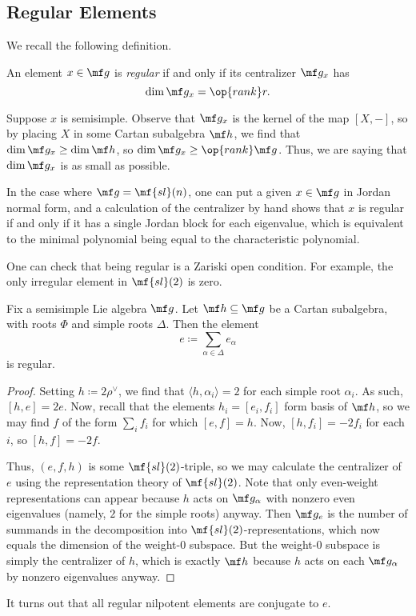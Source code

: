 \documentclass[../notes.tex]{subfiles}
\begin{document}
\subsection{Regular Elements}
We recall the following definition.
\begin{definition}[regular]
	An element $x\in\mf g$ is \textit{regular} if and only if its centralizer $\mf g_x$ has
	\[\dim\mf g_x=\op{rank}r.\]
\end{definition}
\begin{remark}
	Suppose $x$ is semisimple. Observe that $\mf g_x$ is the kernel of the map $[X,-]$, so by placing $X$ in some Cartan subalgebra $\mf h$, we find that $\dim\mf g_x\ge\dim\mf h$, so $\dim\mf g_x\ge\op{rank}\mf g$. Thus, we are saying that $\dim\mf g_x$ is as small as possible.
\end{remark}
\begin{example}
	In the case where $\mf g=\mf{sl}(n)$, one can put a given $x\in\mf g$ in Jordan normal form, and a calculation of the centralizer by hand shows that $x$ is regular if and only if it has a single Jordan block for each eigenvalue, which is equivalent to the minimal polynomial being equal to the characteristic polynomial.
\end{example}
\begin{remark}
	One can check that being regular is a Zariski open condition. For example, the only irregular element in $\mf{sl}(2)$ is zero.
\end{remark}
\begin{proposition}
	Fix a semisimple Lie algebra $\mf g$. Let $\mf h\subseteq\mf g$ be a Cartan subalgebra, with roots $\Phi$ and simple roots $\Delta$. Then the element
	\[e\coloneqq\sum_{\alpha\in\Delta}e_\alpha\]
	is regular.
\end{proposition}
\begin{proof}
	Setting $h\coloneqq2\rho^\lor$, we find that $\langle h,\alpha_i\rangle=2$ for each simple root $\alpha_i$. As such, $[h,e]=2e$. Now, recall that the elements $h_i=[e_i,f_i]$ form basis of $\mf h$, so we may find $f$ of the form $\sum_if_i$ for which $[e,f]=h$. Now, $[h,f_i]=-2f_i$ for each $i$, so $[h,f]=-2f$.

	Thus, $(e,f,h)$ is some $\mf{sl}(2)$-triple, so we may calculate the centralizer of $e$ using the representation theory of $\mf{sl}(2)$. Note that only even-weight representations can appear because $h$ acts on $\mf g_\alpha$ with nonzero even eigenvalues (namely, $2$ for the simple roots) anyway. Then $\mf g_e$ is the number of summands in the decomposition into $\mf{sl}(2)$-representations, which now equals the dimension of the weight-$0$ subspace. But the weight-$0$ subspace is simply the centralizer of $h$, which is exactly $\mf h$ because $h$ acts on each $\mf g_\alpha$ by nonzero eigenvalues anyway.
\end{proof}
\begin{remark}
	It turns out that all regular nilpotent elements are conjugate to $e$.
\end{remark}
\end{document}
